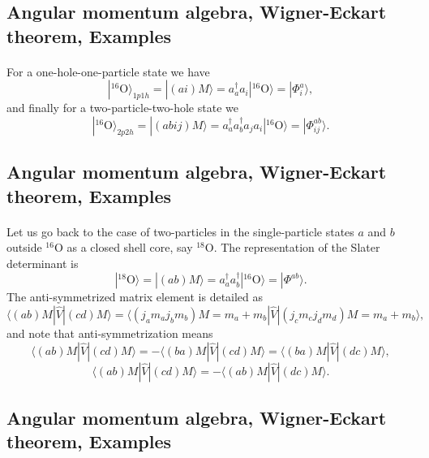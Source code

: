\documentclass[%
twoside,                 %
final,                   %
10pt]{article}
\begin{document}
\subsection*{Angular momentum algebra, Wigner-Eckart theorem, Examples}

\paragraph{}
For a one-hole-one-particle state we have
\[
|^{16}\mathrm{O}\rangle_{1p1h} =|(ai)M\rangle  = a_a^{\dagger}a_i|^{16}\mathrm{O}\rangle=|\Phi_{i}^a\rangle,
\]
and finally for a two-particle-two-hole state we 
\[
|^{16}\mathrm{O}\rangle_{2p2h} =|(abij)M\rangle  = a_a^{\dagger}a_b^{\dagger}a_ja_i|^{16}\mathrm{O}\rangle=|\Phi_{ij}^{ab}\rangle.
\]



\subsection*{Angular momentum algebra, Wigner-Eckart theorem, Examples}

\paragraph{}
Let us go back to the case of two-particles in the single-particle states $a$ and $b$ outside ${}^{16}\mbox{O}$ as a closed shell core, say ${}^{18}\mbox{O}$.
The representation of the Slater determinant is 
\[
|^{18}\mathrm{O}\rangle =|(ab)M\rangle  = a^{\dagger}_aa^{\dagger}_b|^{16}\mathrm{O}\rangle=|\Phi^{ab}\rangle.
\]
The anti-symmetrized matrix element is detailed as 
\[
\langle (ab) M | \hat{V} | (cd) M \rangle = \langle (j_am_aj_bm_b)M=m_a+m_b |  \hat{V} | (j_cm_cj_dm_d)M=m_a+m_b \rangle,
\]
and note that anti-symmetrization means 
\[
\langle (ab) M | \hat{V} | (cd) M \rangle =-\langle (ba) M | \hat{V} | (cd) M \rangle =\langle (ba) M | \hat{V} | (dc) M \rangle,
\]
\[
\langle (ab) M | \hat{V} | (cd) M \rangle =-\langle (ab) M | \hat{V} | (dc) M \rangle. 
\]



\subsection*{Angular momentum algebra, Wigner-Eckart theorem, Examples}
\end{document}
